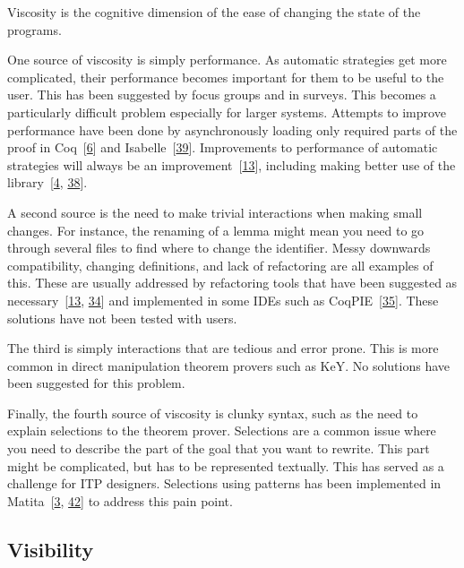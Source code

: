 \documentclass[
]{article}
\begin{document}
Viscosity is the cognitive dimension of the ease of changing the state
of the programs.

One source of viscosity is simply performance. As automatic strategies
get more complicated, their performance becomes important for them to be
useful to the user. This has been suggested by focus groups and in
surveys. This becomes a particularly difficult problem especially for
larger systems. Attempts to improve performance have been done by
asynchronously loading only required parts of the proof in
Coq~{[}\protect\hyperlink{ref-barras_asynchronous_2015}{6}{]} and
Isabelle~{[}\protect\hyperlink{ref-wenzel_asynchronous_2014}{39}{]}.
Improvements to performance of automatic strategies will always be an
improvement~{[}\protect\hyperlink{ref-bourke_challenges_2012}{13}{]},
including making better use of the
library~{[}\protect\hyperlink{ref-asperti_considerations_2010}{4},
\protect\hyperlink{ref-tassi_interactive_2008}{38}{]}.

A second source is the need to make trivial interactions when making
small changes. For instance, the renaming of a lemma might mean you need
to go through several files to find where to change the identifier.
Messy downwards compatibility, changing definitions, and lack of
refactoring are all examples of this. These are usually addressed by
refactoring tools that have been suggested as
necessary~{[}\protect\hyperlink{ref-bourke_challenges_2012}{13},
\protect\hyperlink{ref-ringer_replica_2020}{34}{]} and implemented in
some IDEs such as
CoqPIE~{[}\protect\hyperlink{ref-roe_coqpie_2016}{35}{]}. These
solutions have not been tested with users.

The third is simply interactions that are tedious and error prone. This
is more common in direct manipulation theorem provers such as KeY. No
solutions have been suggested for this problem.

Finally, the fourth source of viscosity is clunky syntax, such as the
need to explain selections to the theorem prover. Selections are a
common issue where you need to describe the part of the goal that you
want to rewrite. This part might be complicated, but has to be
represented textually. This has served as a challenge for ITP designers.
Selections using patterns has been implemented in
Matita~{[}\protect\hyperlink{ref-asperti_user_2007}{3},
\protect\hyperlink{ref-zacchiroli_user_2007}{42}{]} to address this pain
point.

\hypertarget{visibility}{%
\subsection{Visibility}\label{visibility}}
\end{document}
